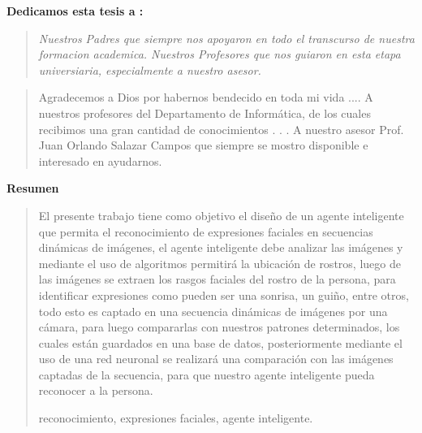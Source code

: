  
 {\bf\Large {Dedicamos esta tesis a :}}
 \vskip 1cm
\begin{quotation}
{\it Nuestros Padres que siempre nos apoyaron en todo el transcurso de nuestra formacion academica.
\vskip 1cm
Nuestros Profesores que nos guiaron en esta etapa universiaria, especialmente a nuestro asesor.
}
\end{quotation}


\newpage

 {\bf\Large {}}
 \vskip 1.5cm
\begin{quotation}
Agradecemos a Dios por habernos bendecido en toda mi vida ....
{\vskip 1cm}
A nuestros profesores del Departamento de Informática, de los cuales recibimos una gran cantidad de conocimientos  . . .
\vskip 1cm
A nuestro asesor Prof. Juan Orlando Salazar Campos que siempre se mostro disponible e interesado en ayudarnos.
\vskip 1cm
 \end{quotation}


\newpage
\begin{center}
 {\bf\LARGE Resumen}
\end{center} 
\vskip 0.5cm
\begin{quotation}

El presente trabajo tiene como objetivo el diseño de un agente inteligente que permita el reconocimiento de expresiones faciales en secuencias dinámicas de imágenes, el agente inteligente debe analizar las imágenes y mediante el uso de algoritmos permitirá la ubicación de rostros, luego de las imágenes se extraen los rasgos faciales del rostro de la persona, para identificar expresiones como pueden ser una sonrisa, un guiño, entre otros, todo esto es captado en una secuencia dinámicas de imágenes por una cámara, para luego compararlas con nuestros patrones determinados, los cuales están guardados en una base de datos, posteriormente mediante el uso de una red neuronal se realizará una comparación con las imágenes captadas de la secuencia, para que nuestro agente inteligente pueda reconocer a la persona.    

\vskip 0.3cm
\hspace*{-0.6cm}{\bf Palabras claves:} reconocimiento, expresiones faciales, agente inteligente.
\end{quotation}


